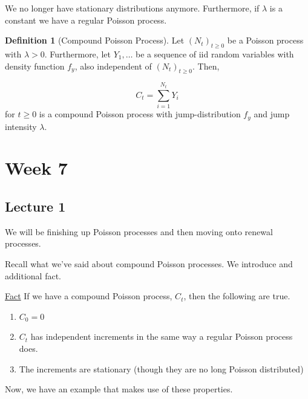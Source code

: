 \documentclass[12pt]{article}
\theoremstyle{definition}
\newtheorem{definition}{Definition}[section]
\begin{document}
We no longer have stationary distributions anymore. Furthermore, if $\lambda$ is a constant we have a regular Poisson process.

\begin{definition}[Compound Poisson Process]
  Let $(N_t)_{t \geq 0}$ be a Poisson process with $\lambda > 0$. Furthermore, let $Y_1, \dots$ be a sequence of iid random variables with density function $f_y$, also independent of $(N_t)_{t \geq 0}$. Then,

  $$
C_t = \sum_{i =1}^{N_t} Y_i
  $$
  for $t \geq 0$ is a compound Poisson process with jump-distribution $f_y$ and jump intensity $\lambda$.

\end{definition}

\section{Week 7}
\subsection{Lecture 1}

We will be finishing up Poisson processes and then moving onto renewal processes.

Recall what we've said about compound Poisson processes. We introduce and additional fact.

\underline{Fact}
If we have a compound Poisson process, $C_t$, then the following are true.
\begin{enumerate}
  \item $C_0 = 0$
  \item $C_t$ has independent increments in the same way a regular Poisson process does.
  \item The increments are stationary (though they are no long Poisson distributed)
\end{enumerate}

Now, we have an example that makes use of these properties.
\end{document}
